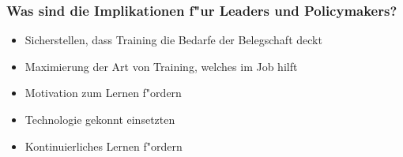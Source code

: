 \subsubsection{Was sind die Implikationen f"ur Leaders und Policymakers?}
\begin{itemize}
        \item Sicherstellen, dass Training die Bedarfe der Belegschaft deckt
        \item Maximierung der Art von Training, welches im Job hilft
        \item Motivation zum Lernen f"ordern
        \item Technologie gekonnt einsetzten
        \item Kontinuierliches Lernen f"ordern
\end{itemize}
